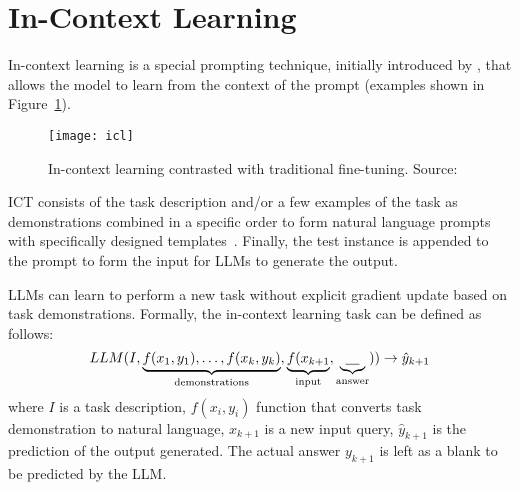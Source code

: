 \section{In-Context Learning}
\label{sec:in-context-learning}
In-context learning is a special prompting technique, initially introduced by \textcite{brown2020language}, that allows the model to learn from the context of the prompt (examples shown in Figure~\ref{fig:in-context-learning}).
\begin{figure}[h!]
	\centering
	\texttt{[image: icl]}
	\caption{In-context learning contrasted with traditional fine-tuning. Source: \textcite{brown2020language}}
	\label{fig:in-context-learning}
\end{figure}
ICT consists of the task description and/or a few examples of the task as demonstrations combined in a specific order to form natural language prompts with specifically designed templates~\cite{brown2020language}.
Finally, the test instance is appended to the prompt to form the input for LLMs to generate the output.

LLMs can learn to perform a new task without explicit gradient update based on task demonstrations.
Formally, the in-context learning task can be defined as follows:
\begin{equation}
	LLM(I, \underbrace{f(x_1, y_1), \dots, f(x_k, y_k)}_\text{demonstrations}, \underbrace{f(x_{k+1}}_\text{input}, \underbrace{\uline{~~~}}_\text{answer})) \rightarrow \hat{y}_{k+1}
	\label{eq:ict}
\end{equation}
where $I$ is a task description, $f(x_i, y_i)$ function that converts task demonstration to natural language, $x_{k+1}$ is a new input query, $\hat{y}_{k+1}$ is the prediction of the output generated. The actual answer $y_{k+1}$ is left as a blank to be predicted by the LLM\@.

